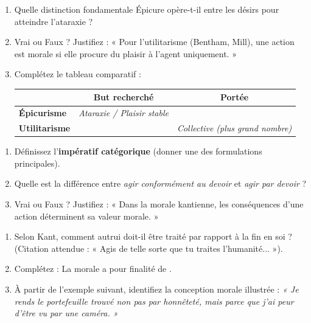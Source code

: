 \documentclass[11pt]{article}
\begin{document}
\begin{exercice}
\begin{enumerate}
    \item Quelle distinction fondamentale Épicure opère-t-il entre les désirs pour atteindre l'ataraxie ?
    \item Vrai ou Faux ? Justifiez : « Pour l'utilitarisme (Bentham, Mill), une action est morale si elle procure du plaisir à l'agent uniquement. »
    \item Complétez le tableau comparatif :
    \begin{tabular}{|l|c|c|}
    \hline
    & \textbf{But recherché} & \textbf{Portée} \\
    \hline
    \textbf{Épicurisme} & \textit{Ataraxie / Plaisir stable} & \underline{\hspace{3cm}} \\
    \hline
    \textbf{Utilitarisme} & \underline{\hspace{3cm}} & \textit{Collective (plus grand nombre)} \\
    \hline
    \end{tabular}
\end{enumerate}
\end{exercice}

\begin{exercice}
\begin{enumerate}
    \item Définissez l'\textbf{impératif catégorique} (donner une des formulations principales).
    \item Quelle est la différence entre \textit{agir conformément au devoir} et \textit{agir par devoir} ?
    \item Vrai ou Faux ? Justifiez : « Dans la morale kantienne, les conséquences d'une action déterminent sa valeur morale. »
\end{enumerate}
\end{exercice}

\begin{exercice}
\begin{enumerate}
    \item Selon Kant, comment autrui doit-il être traité par rapport à la fin en soi ? (Citation attendue : « Agis de telle sorte que tu traites l'humanité... »).
    \item Complétez : La morale a pour finalité de \underline{\hspace{6cm}}.
    \item À partir de l'exemple suivant, identifiez la conception morale illustrée : \textit{« Je rends le portefeuille trouvé non pas par honnêteté, mais parce que j'ai peur d'être vu par une caméra. »}
\end{enumerate}
\end{exercice}
\end{document}
